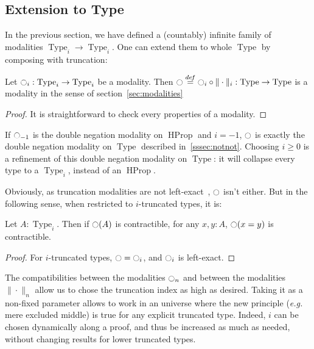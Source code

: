 \documentclass[notfinal]{jfrarticle}
\DeclareMathOperator{\Type}{Type}
\DeclareMathOperator{\HProp}{HProp}
\newcommand \defeq {\overset{de\hspace{-0.2ex}f}{=}}
\newcommand{\modal}{\ensuremath{\ocircle}}
\begin{document}


\subsection{Extension to Type}
\label{ssec:extension-type}

In the previous section, we have defined a (countably) infinite family of
modalities $\Type_i \to \Type_i$. One can extend them to whole
$\Type$ by composing with truncation:

\begin{lem}\label{lem:type}
  Let $\modal_i:\Type_i \to \Type_i$ be a modality. Then $\modal
  \defeq \modal_i
  \circ \|\cdot\|_i : \Type \to \Type$ is a modality in the sense
  of section~\ref{sec:modalities}
\end{lem}
\begin{proof}
  It is straightforward to check every properties of a modality.
\end{proof}
If $\modal_{-1}$ is the double negation modality on $\HProp$ and
$i=-1$, $\modal$ is exactly the double negation modality on $\Type$
described in~\ref{sssec:notnot}.
Choosing $i\geqslant 0$ is a refinement of this double negation
modality on $\Type$: it will collapse every type to a $\Type_i$,
instead of an $\HProp$.

Obviously, as truncation modalities are not left-exact~\cite[Exercise
7.11]{hottbook}, $\modal$ isn't either. But in the following sense, when
restricted to $i$-truncated types, it is:
\begin{lem}
  Let $A:\Type_i$. Then if $\modal(A)$ is contractible, for any $x,y:A$,
  $\modal(x=y)$ is contractible.
\end{lem}
\begin{proof}
  For $i$-truncated types, $\modal = \modal_i$, and $\modal_i$ is left-exact.
\end{proof}

The compatibilities between the modalities $\modal_n$ and between the
modalities $\|\cdot \|_n$ allow us to chose the truncation index as
high as desired.
Taking it as a non-fixed parameter allows to work in an
universe where the new principle ({\em e.g.} mere excluded middle) is
true for any explicit truncated type. Indeed, $i$ can be chosen
dynamically along a proof, and thus be increased as much as needed,
without changing results for lower truncated types.
\end{document}
